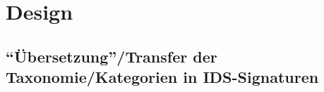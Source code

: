 \chapter{Design}%
\label{cha:design}



\section{“Übersetzung”/Transfer der Taxonomie/Kategorien in IDS-Signaturen} 

